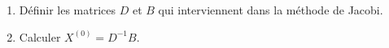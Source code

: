 \begin{enumerate}
    \vspace{1em}
     On veut résoudre par la méthode itérative de Jacobi le système suivant :
$$
\left\{\begin{array}{l}
4 x+2 y=64 \\
x+4 y+2 z=84 \\
y+5 z=77
\end{array}\right.
$$

    \item Définir les matrices $D$ et $B$ qui interviennent dans la méthode de Jacobi.

    \item Calculer $X^{(0)}=D^{-1} B$.


\end{enumerate}

